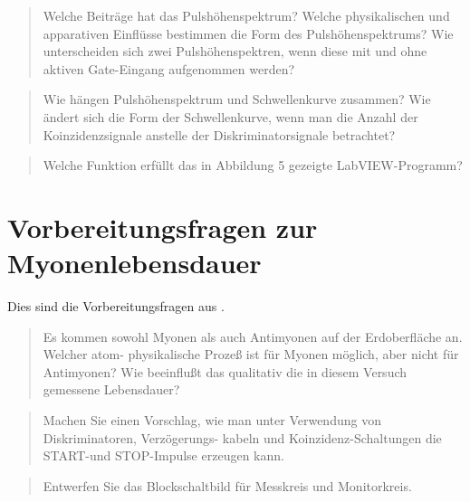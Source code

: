 \documentclass[11pt, ngerman, fleqn, DIV=15, headinclude, BCOR=2cm]{scrreprt}
\begin{document}
\begin{quote}
    Welche Beiträge hat das Pulshöhenspektrum? Welche physikalischen und
    apparativen Einflüsse bestimmen die Form des Pulshöhenspektrums? Wie
    unterscheiden sich zwei Pulshöhenspektren, wenn diese mit und ohne aktiven
    Gate-Eingang aufgenommen werden?
\end{quote}


\begin{quote}
    Wie hängen Pulshöhenspektrum und Schwellenkurve zusammen? Wie ändert sich
    die Form der Schwellenkurve, wenn man die Anzahl der Koinzidenzsignale
    anstelle der Diskriminatorsignale betrachtet?
\end{quote}


\begin{quote}
    Welche Funktion erfüllt das in Abbildung 5 gezeigte LabVIEW-Programm?
\end{quote}


\section{Vorbereitungsfragen zur Myonenlebensdauer}

Dies sind die Vorbereitungsfragen aus \parencite[14]{physik512-Anleitung}.

\begin{quote}
    Es kommen sowohl Myonen als auch Antimyonen auf der Erdoberfläche an.
    Welcher atom- physikalische Prozeß ist für Myonen möglich, aber nicht für
    Antimyonen? Wie beeinflußt das qualitativ die in diesem Versuch gemessene
    Lebensdauer?
\end{quote}


\begin{quote}
    Machen Sie einen Vorschlag, wie man unter Verwendung von Diskriminatoren,
    Verzögerungs- kabeln und Koinzidenz-Schaltungen die START-und STOP-Impulse
    erzeugen kann.
\end{quote}


\begin{quote}
    Entwerfen Sie das Blockschaltbild für Messkreis und Monitorkreis.
\end{quote}
\end{document}
